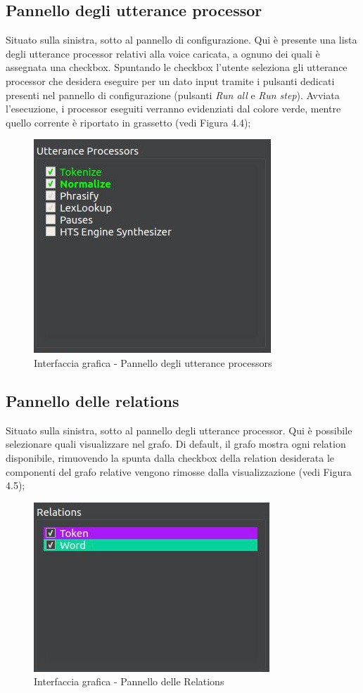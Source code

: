 \documentclass[openany,12pt,a4paper]{report}
\begin{document}
 	\subsection{Pannello degli utterance processor}
 	Situato sulla sinistra, sotto al pannello di configurazione. Qui è presente una lista degli utterance processor relativi alla voice caricata, a ognuno dei quali è assegnata una checkbox. Spuntando le checkbox l'utente seleziona gli utterance processor che desidera eseguire per un dato input tramite i pulsanti dedicati presenti nel pannello di configurazione (pulsanti \textit{Run all} e \textit{Run step}). Avviata l'esecuzione, i processor eseguiti verranno evidenziati dal colore verde, mentre quello corrente è riportato in grassetto (vedi Figura 4.4);
 		\begin{figure}[H]
 			
 			\centering
 			
 				\includegraphics[width=.4\textwidth]{./img/pannello_processors}
 			
 			\caption{Interfaccia grafica - Pannello degli utterance processors}
 			
 		\end{figure}
 		
 	\subsection{Pannello delle relations}
 	Situato sulla sinistra, sotto al pannello degli utterance processor. Qui è possibile selezionare quali  visualizzare nel grafo. Di default, il grafo mostra ogni relation disponibile, rimuovendo la spunta dalla checkbox della relation desiderata le componenti del grafo relative vengono rimosse dalla visualizzazione (vedi Figura 4.5);
 		\begin{figure}[H]
 			
 			\centering
 			
 				\includegraphics[width=.4\textwidth]{./img/pannello_relations}
 			
 			\caption{Interfaccia grafica - Pannello delle Relations}
 			
 		\end{figure}
 	
\end{document}
